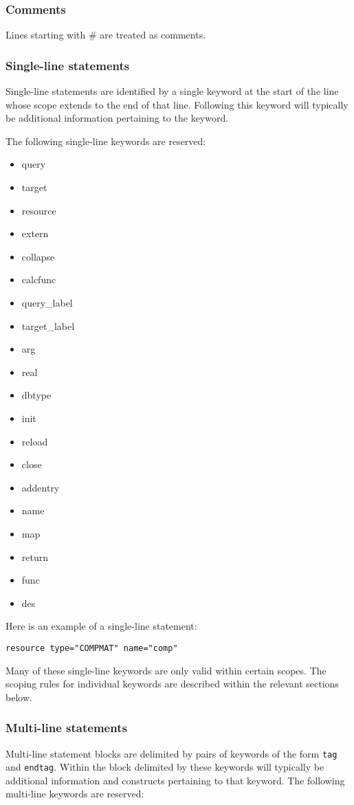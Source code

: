 \subsubsection{Comments}
Lines starting with \# are treated as comments.

\subsubsection{Single-line statements}
Single-line statements are identified by a single keyword at the start of the line
whose scope extends to the end of that line.
Following this keyword will typically be additional information
pertaining to the keyword.

The following single-line keywords are reserved:

\begin{itemize}
\item query
\item target
\item resource
\item extern
\item collapse
\item calcfunc
\item query\_label
\item target\_label
\item arg
\item real
\item dbtype
\item init
\item reload
\item close
\item addentry
\item name
\item map
\item return
\item func
\item des
\end{itemize}

Here is an example of a single-line statement:

\begin{verbatim}
resource type="COMPMAT" name="comp"
\end{verbatim}

Many of these single-line keywords are only valid within certain scopes.
The scoping rules for individual keywords are described within the
relevant sections below.

\subsubsection{Multi-line statements}
Multi-line statement blocks are delimited by pairs of keywords
of the form {\tt tag} and {\tt endtag}.
Within the block delimited by these keywords will typically
be additional information and constructs pertaining to that keyword.
The following multi-line keywords are reserved:


